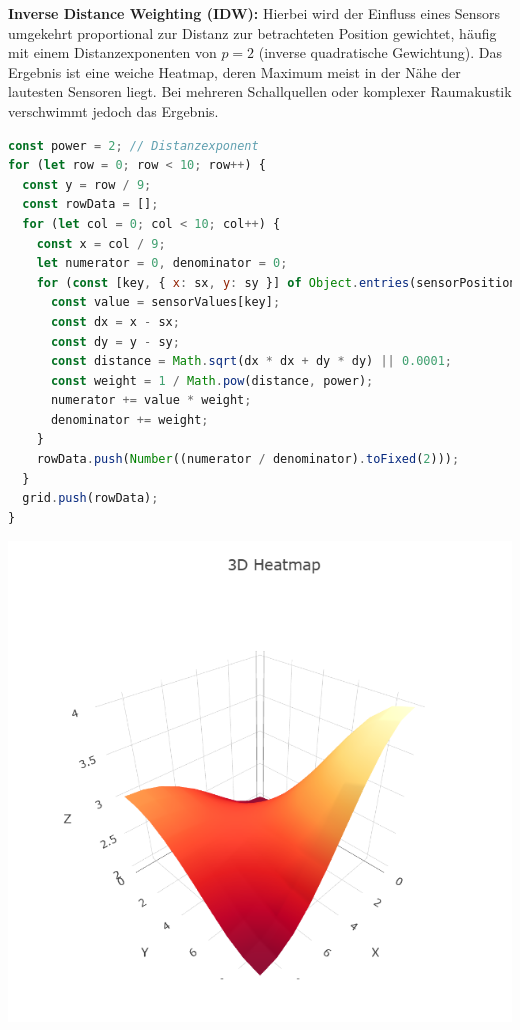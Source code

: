 \textbf{Inverse Distance Weighting (IDW):}  
Hierbei wird der Einfluss eines Sensors umgekehrt proportional zur Distanz zur betrachteten Position gewichtet, häufig mit einem Distanzexponenten von $p=2$ (inverse quadratische Gewichtung). Das Ergebnis ist eine weiche Heatmap, deren Maximum meist in der Nähe der lautesten Sensoren liegt. Bei mehreren Schallquellen oder komplexer Raumakustik verschwimmt jedoch das Ergebnis.
\begin{lstlisting}[language=JavaScript, caption={Inverse Distance Weighting}]
const power = 2; // Distanzexponent
for (let row = 0; row < 10; row++) {
  const y = row / 9;
  const rowData = [];
  for (let col = 0; col < 10; col++) {
    const x = col / 9;
    let numerator = 0, denominator = 0;
    for (const [key, { x: sx, y: sy }] of Object.entries(sensorPositions)) {
      const value = sensorValues[key];
      const dx = x - sx;
      const dy = y - sy;
      const distance = Math.sqrt(dx * dx + dy * dy) || 0.0001;
      const weight = 1 / Math.pow(distance, power);
      numerator += value * weight;
      denominator += weight;
    }
    rowData.push(Number((numerator / denominator).toFixed(2)));
  }
  grid.push(rowData);
}
\end{lstlisting}
\begin{minipage}[b]{0.5\textwidth}
  \includegraphics[width=\textwidth]{../images/Heatmap/IDWHeatmap.png}
\end{minipage}

